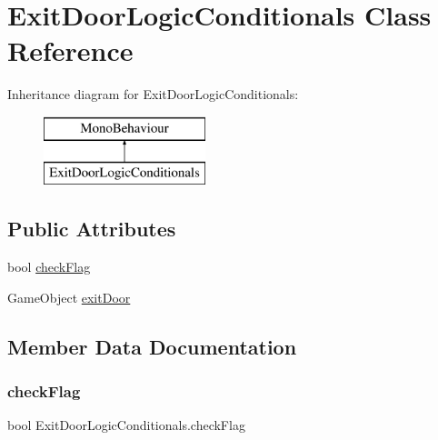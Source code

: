 \hypertarget{class_exit_door_logic_conditionals}{}\section{Exit\+Door\+Logic\+Conditionals Class Reference}
\label{class_exit_door_logic_conditionals}
Inheritance diagram for Exit\+Door\+Logic\+Conditionals\+:\begin{figure}[H]
\begin{center}
\leavevmode
\includegraphics[height=2.000000cm]{class_exit_door_logic_conditionals}
\end{center}
\end{figure}
\subsection*{Public Attributes}
\begin{DoxyCompactItemize}
\item 
bool \hyperlink{class_exit_door_logic_conditionals_acbcfa846f3d5327c2c33804410db1917}{check\+Flag}
\item 
Game\+Object \hyperlink{class_exit_door_logic_conditionals_a49f38a550fb785a6515f412aaccd4231}{exit\+Door}
\end{DoxyCompactItemize}


\subsection{Member Data Documentation}
\mbox{\label{class_exit_door_logic_conditionals_acbcfa846f3d5327c2c33804410db1917}} 
\subsubsection{\texorpdfstring{check\+Flag}{checkFlag}}
{\footnotesize\ttfamily bool Exit\+Door\+Logic\+Conditionals.\+check\+Flag}

\mbox{\label{class_exit_door_logic_conditionals_a49f38a550fb785a6515f412aaccd4231}} 
